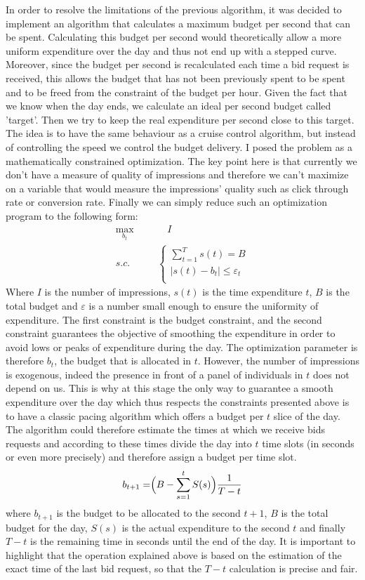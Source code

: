 \documentclass[12pt]{article}
\begin{document}
In order to resolve the limitations of the previous algorithm, it was decided to implement an algorithm that calculates a maximum budget per second that can be spent. Calculating this budget per second would theoretically allow a more uniform expenditure over the day and thus not end up with a stepped curve. Moreover, since the budget per second is recalculated each time a bid request is received, this allows the budget that has not been previously spent to be spent and to be freed from the constraint of the budget per hour. Given the fact that we know when the day ends, we calculate an ideal per second budget called 'target'. Then we try to keep the real expenditure per second close to this target. The idea is to have the same behaviour as a cruise control algorithm, but instead of controlling the speed we control the budget delivery. I posed the problem as a mathematically constrained optimization. The key point here is that currently we don't have a measure of quality of impressions and therefore we can't maximize on a variable that would measure the impressions' quality such as click through rate or conversion rate. Finally we can simply reduce such an optimization program to the following form:
\begin{align*}
\max_{b_t} &\quad I \\
s.c.  \qquad & 
\left\{
\begin{array}{ll} 
\displaystyle \sum_{t=1}^{T} s(t) = B\\
|s(t) - b_t | \leq \varepsilon_t\\
\end{array}
\right.
\end{align*}
Where $I$ is the number of impressions, $s(t)$ is the time expenditure $t$, $B$ is the total budget and $\varepsilon$ is a number small enough to ensure the uniformity of expenditure. The first constraint is the budget constraint, and the second constraint guarantees the objective of smoothing the expenditure in order to avoid lows or peaks of expenditure during the day. The optimization parameter is therefore $b_t$, the budget that is allocated in $t$. However, the number of impressions is exogenous, indeed the presence in front of a panel of individuals in $t$ does not depend on us. This is why at this stage the only way to guarantee a smooth expenditure over the day which thus respects the constraints presented above is to have a classic pacing algorithm which offers a budget per $t$ slice of the day. The algorithm could therefore estimate the times at which we receive bids requests and according to these times divide the day into $t$ time slots (in seconds or even more precisely) and therefore assign a budget per time slot. 
$$b_{t+1} = \Bigr(B - \displaystyle \sum_{s=1}^{t} S(s)\Bigl) \dfrac{1}{T-t}$$
where $b_{t+1}$ is the budget to be allocated to the second $t+1$, $B$ is the total budget for the day, $S(s)$ is the actual expenditure to the second $t$ and finally $T-t$ is the remaining time in seconds until the end of the day. It is important to highlight that the operation explained above is based on the estimation of the exact time of the last bid request, so that the $T-t$ calculation is precise and fair.\\ 
\end{document}
